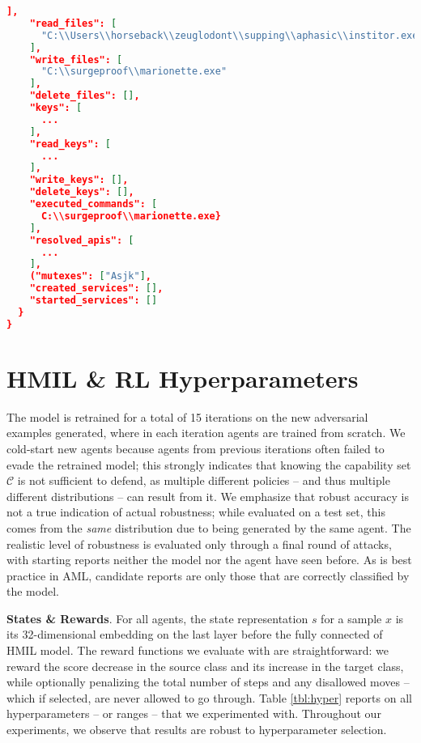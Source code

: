 \begin{lstlisting}[language=json,label=lst:example_report_adv, caption=Modified report entries]
    ],
    "read_files": [
      "C:\\Users\\horseback\\zeuglodont\\supping\\aphasic\\institor.exe"
    ],
    "write_files": [
      "C:\\surgeproof\\marionette.exe"
    ],
    "delete_files": [],
    "keys": [
      ...
    ],
    "read_keys": [
      ...
    ],
    "write_keys": [],
    "delete_keys": [],
    "executed_commands": [
      C:\\surgeproof\\marionette.exe}
    ],
    "resolved_apis": [
      ...
    ],
    ("mutexes": ["Asjk"],
    "created_services": [],
    "started_services": []
  }
}
\end{lstlisting}

\section{HMIL \& RL Hyperparameters}
\label{app:hyper}

The model is retrained for a total of 15 iterations on the new adversarial examples generated, where in each iteration agents are trained from scratch.
We cold-start new agents because agents from previous iterations often failed to evade the retrained model; this strongly indicates that knowing the capability set $\mathcal{C}$ is not sufficient to defend, as multiple different policies -- and thus multiple different distributions -- can result from it.
We emphasize that robust accuracy is not a true indication of actual robustness; while evaluated on a test set, this comes from the \textit{same} distribution due to being generated by the same agent.
The realistic level of robustness is evaluated only through a final round of attacks, with starting reports neither the model nor the agent have seen before.
As is best practice in \gls{AML}, candidate reports are only those that are correctly classified by the model.

\textbf{States \& Rewards}. For all agents, the state representation $s$ for a sample $x$ is its 32-dimensional embedding on the last layer before the fully connected of \gls{HMIL} model. 
The reward functions we evaluate with are straightforward: we reward the score decrease in the source class and its increase in the target class, while optionally penalizing the total number of steps and any disallowed moves -- which if selected, are never allowed to go through.
Table \ref{tbl:hyper} reports on all hyperparameters -- or ranges -- that we experimented with.
Throughout our experiments, we observe that results are robust to hyperparameter selection.

